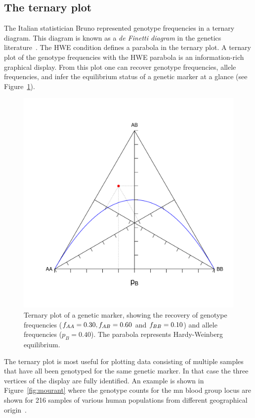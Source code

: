 \documentclass[nojss]{jss}
\begin{document}
\subsection{The ternary plot}
\label{subsec:ternary}
The Italian statistician Bruno \cite{deFinetti}
represented genotype frequencies in a ternary diagram. This diagram is
known as a {\it de Finetti diagram} in the genetics
literature~\citep{Cannings}.  The HWE condition defines a parabola in
the ternary plot.  A ternary plot of the genotype frequencies with the
HWE parabola is an information-rich graphical display. From this plot
one can recover genotype frequencies, allele frequencies, and infer
the equilibrium status of a genetic marker at a glance (see
Figure~\ref{fig:ternary}).

\begin{figure}[t!]
\centering
\includegraphics[width=.6\textwidth, trim=0 40 0 40, clip]{TernaryPlot.pdf}
\caption{Ternary plot of a genetic marker, showing the recovery of genotype frequencies ($f_{AA} = 0.30, f_{AB} = 0.60$ and
  $f_{BB} = 0.10$) and allele frequencies ($p_B = 0.40$). The parabola represents Hardy-Weinberg equilibrium.}
\label{fig:ternary}
\end{figure}
The ternary plot is most useful for plotting data consisting of
multiple samples that have all been genotyped for the same genetic
marker. In that case the three vertices of the display are fully
identified. An example is shown in Figure~\ref{fig:mourant} where the
genotype counts for the {\sc mn} blood group locus are shown for 216
samples of various human populations from different geographical
origin~\cite[Table 2.5]{Mourant}.
\end{document}
